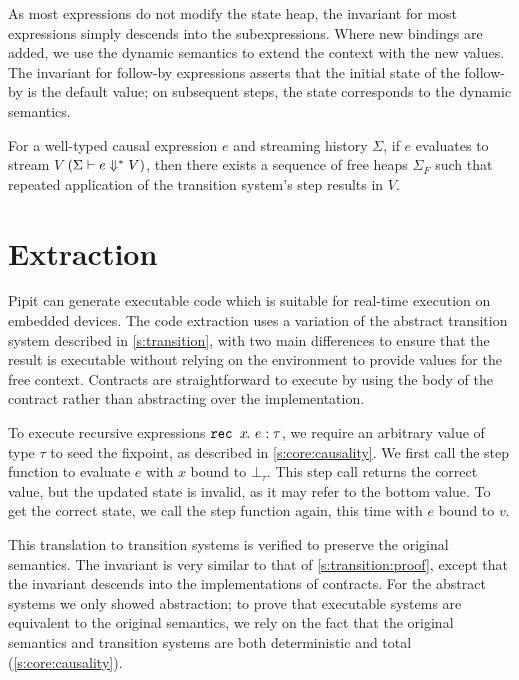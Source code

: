 \documentclass[a4paper,UKenglish,cleveref, autoref, thm-restate,anonymous]{lipics-v2021}
\begin{document}
As most expressions do not modify the state heap, the invariant for most expressions simply descends into the subexpressions.
Where new bindings are added, we use the dynamic semantics to extend the context with the new values.
The invariant for follow-by expressions asserts that the initial state of the follow-by is the default value; on subsequent steps, the state corresponds to the dynamic semantics.

\begin{theorem}
  For a well-typed causal expression $e$ and streaming history $\Sigma$, if $e$ evaluates to stream $V$ $(\Sigma \vdash e \Downarrow^{*} V)$, then there exists a sequence of free heaps $\Sigma_{F}$ such that repeated application of the transition system's step results in $V$.
\end{theorem}

 


\section{Extraction}
\label{s:extraction}

Pipit can generate executable code which is suitable for real-time execution on embedded devices.
The code extraction uses a variation of the abstract transition system described in \autoref{s:transition}, with two main differences to ensure that the result is executable without relying on the environment to provide values for the free context.
Contracts are straightforward to execute by using the body of the contract rather than abstracting over the implementation.

To execute recursive expressions $\texttt{rec~} x\hspace{-0.1em}.~e : \tau$, we require an arbitrary value of type $\tau$ to seed the fixpoint, as described in \autoref{s:core:causality}.
We first call the step function to evaluate $e$ with $x$ bound to $\bot_\tau$.
This step call returns the correct value, but the updated state is invalid, as it may refer to the bottom value.
To get the correct state, we call the step function again, this time with $e$ bound to $v$.

This translation to transition systems is verified to preserve the original semantics.
The invariant is very similar to that of \autoref{s:transition:proof}, except that the invariant descends into the implementations of contracts.
For the abstract systems we only showed abstraction; to prove that executable systems are equivalent to the original semantics, we rely on the fact that the original semantics and transition systems are both deterministic and total (\autoref{s:core:causality}).
\end{document}

